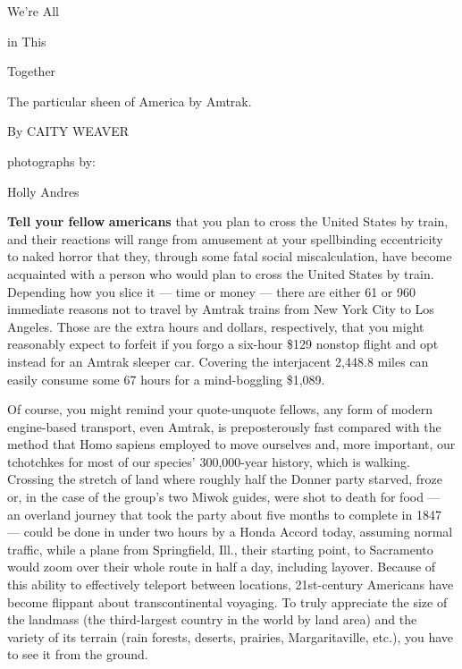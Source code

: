 We're All

in This

Together

 The particular sheen of America by Amtrak.

By CAITY WEAVER

photographs by:

Holly Andres

\textbf{Tell your fellow} \textbf{americans} that you plan to cross the
United States by train, and their reactions will range from amusement at
your spellbinding eccentricity to naked horror that they, through some
fatal social miscalculation, have become acquainted with a person who
would plan to cross the United States by train. Depending how you slice
it --- time or money --- there are either 61 or 960 immediate reasons
not to travel by Amtrak trains from New York City to Los Angeles. Those
are the extra hours and dollars, respectively, that you might reasonably
expect to forfeit if you forgo a six-hour \$129 nonstop flight and opt
instead for an Amtrak sleeper car. Covering the interjacent 2,448.8
miles can easily consume some 67 hours for a mind-boggling \$1,089.

Of course, you might remind your quote-unquote fellows, any form of
modern engine-based transport, even Amtrak, is preposterously fast
compared with the method that Homo sapiens employed to move ourselves
and, more important, our tchotchkes for most of our species'
300,000-year history, which is walking. Crossing the stretch of land
where roughly half the Donner party starved, froze or, in the case of
the group's two Miwok guides, were shot to death for food --- an
overland journey that took the party about five months to complete in
1847 --- could be done in under two hours by a Honda Accord today,
assuming normal traffic, while a plane from Springfield, Ill., their
starting point, to Sacramento would zoom over their whole route in half
a day, including layover. Because of this ability to effectively
teleport between locations, 21st-century Americans have become flippant
about transcontinental voyaging. To truly appreciate the size of the
landmass (the third-largest country in the world by land area) and the
variety of its terrain (rain forests, deserts, prairies, Margaritaville,
etc.), you have to see it from the ground.

